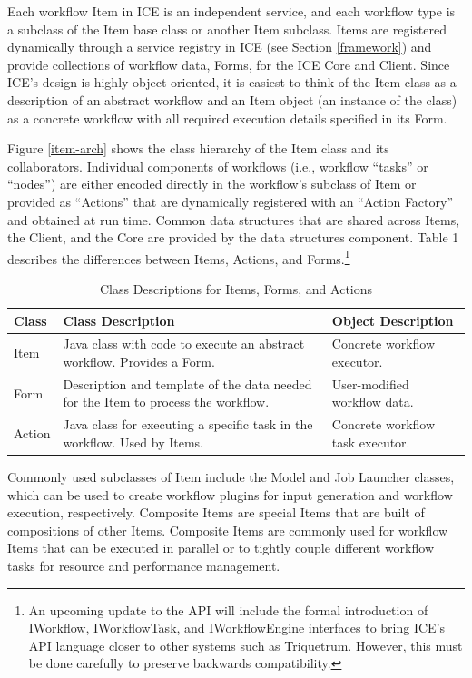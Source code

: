 Each workflow Item in ICE is an independent service, and each
workflow type is a subclass of the Item base class or another Item subclass. Items are registered dynamically
through a service registry in ICE (see Section \ref{framework}) and
provide collections of workflow data, Forms, for the ICE Core and Client. Since ICE's design is
highly object oriented, it is easiest to think of the Item class as a
description of an abstract workflow and an Item object (an instance of
the class) as a concrete workflow with all required execution details
specified in its Form.

Figure \ref{item-arch} shows the class hierarchy of the Item class and its collaborators.
Individual components of workflows (i.e., workflow ``tasks'' or
``nodes'') are either encoded directly in the workflow's subclass of
Item or provided as ``Actions'' that are dynamically registered with
an ``Action Factory'' and obtained at run time. Common data structures that are shared across Items, the Client, and the Core are provided by the data structures component. Table 1 describes the differences between Items, Actions, and Forms.\footnote{An upcoming 
update to the API will include the formal introduction of
IWorkflow, IWorkflowTask, and IWorkflowEngine interfaces to bring ICE's
API language closer to other systems such as Triquetrum. However, this must be done carefully to preserve backwards compatibility.}

\begin{table}[t]
\begin{tabularx}{\textwidth}{|l|X|l|}
\hline
Class & Class Description & Object Description\tabularnewline\hline
Item & Java class with code to execute an abstract workflow. Provides a
Form. & Concrete workflow executor.\tabularnewline\hline
Form & Description and template of the data needed for the Item to
process the workflow. & User-modified workflow data.\tabularnewline\hline
Action & Java class for executing a specific task in the workflow. Used
by Items. & Concrete workflow task executor.\tabularnewline\hline
\end{tabularx}
\caption{Class Descriptions for Items, Forms, and Actions}
\end{table}

Commonly used subclasses of Item include the Model and Job Launcher classes, which can be  used to create workflow plugins for input generation and workflow execution, respectively. Composite Items are special Items that are built of compositions of other Items. Composite Items are commonly used for workflow Items that can be executed in parallel or to tightly couple different workflow tasks for resource and performance management.

